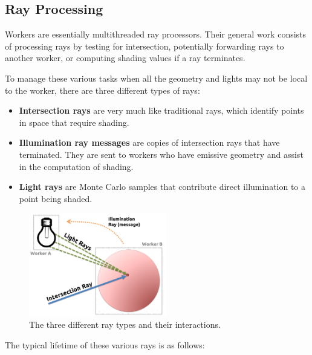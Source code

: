 \documentclass[a4paper,twoside]{article}
\begin{document}
\subsection{Ray Processing}
\label{process}

Workers are essentially multithreaded ray processors. 
Their general work consists of processing rays by
testing for intersection, potentially forwarding rays to another worker,
or computing shading values if a ray terminates.

To manage these various tasks when all the geometry and lights may not be local
to the worker, there are three different types of rays:

\begin{itemize}
    \item \textbf{Intersection rays} are very much like traditional rays, which identify points in space 
    that require shading.
    \item \textbf{Illumination ray messages} are copies of intersection rays that
        have terminated. They are sent to workers who have emissive geometry and assist 
        in the computation of shading.
    \item \textbf{Light rays} are Monte Carlo samples that contribute direct
        illumination to a point being shaded. %
\end{itemize}

\begin{figure}[h!]
    \centering
    \includegraphics[width=60mm]{figures/raytypes.png}
    \caption{The three different ray types and their interactions.}
    \label{fig:raytypes}
\end{figure}

\noindent The typical lifetime of these various rays is as follows:
\end{document}
